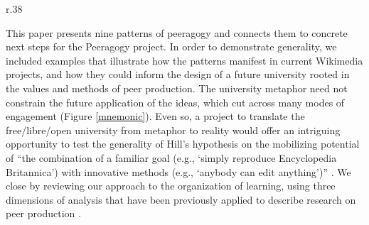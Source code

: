 



\begingroup
\setlength{\columnsep}{5pt}%

\begin{wrapfigure}{r}{.38\textwidth}
\vspace{-2cm}
\hspace{.15cm}
\resizebox{.37\textwidth}{!}{

}
\vspace{-2cm}
\caption{Mnemonic \label{mnemonic}}
\vspace{-.5cm}
\end{wrapfigure}

This paper presents nine patterns of peeragogy and connects them to
concrete next steps for the Peeragogy project.  In order to
demonstrate generality, we included examples that illustrate how the
patterns manifest in current Wikimedia projects, and how they could
inform the design of a future university rooted in the values and
methods of peer production.
%
The university metaphor need not constrain the future application of
the ideas, which cut across many modes of engagement (Figure \ref{mnemonic}).
Even so, a project to translate the free\slash libre\slash open
university from metaphor to reality would offer an intriguing
opportunity to test the generality of Hill's hypothesis on the
mobilizing potential of ``the combination of a familiar goal (e.g.,
`simply reproduce Encyclopedia Britannica') with innovative methods
(e.g., `anybody can edit anything')'' \cite[p.~13]{mako-thesis}.  We
close by reviewing our approach to the organization of learning, using
three dimensions of analysis that have been previously applied to
describe research on peer production \cite{benkler2015peer}.

